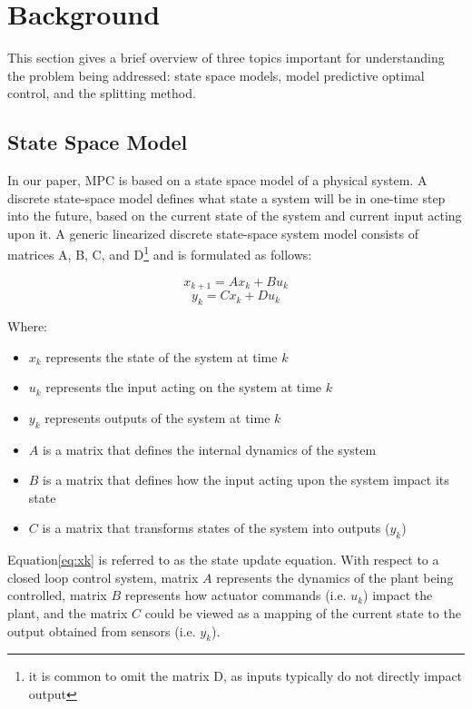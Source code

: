 \section{Background}\label{MPC}
This section gives a brief overview of three topics important for understanding the problem being addressed: state space models, model predictive optimal control, and the splitting method.
\subsection{State Space Model}
In our paper, MPC is based on a state space model of a physical system. A discrete state-space model defines what state a system will be in one-time step into the future, based on the current state of the system and current input acting upon it. A generic linearized discrete state-space system model consists of matrices A, B, C, and D\footnote{it is common to omit the matrix D, as inputs typically do not directly impact output} and is formulated as follows:

\begin{equation}
\label{eq:xk}
x_{k+1}=A x_k + B u_k 
\end{equation}  
\begin{equation}
\label{eq:yk}
y_{k}=C x_k + D u_k  
\end{equation}  

Where:
\begin{itemize}
  \item $x_k$ represents the state of the system at time $k$
  \item $u_k$ represents the input acting on the system at time $k$
  \item $y_k$ represents outputs of the system at time $k$
  \item $A$ is a matrix that defines the internal dynamics of the system
  \item $B$ is a matrix that defines how the input acting upon the system impact its state
  \item $C$ is a matrix that transforms states of the system into outputs ($y_k$)
\end{itemize}

Equation\cref{eq:xk} is referred to as the state update equation. With respect to a closed loop control system, matrix $A$ represents the dynamics of the plant being controlled, matrix $B$ represents how actuator commands (i.e. $u_k$) impact the plant, and the matrix $C$ could be viewed as a mapping of the current state to the output obtained from sensors (i.e. $y_{k}$).

